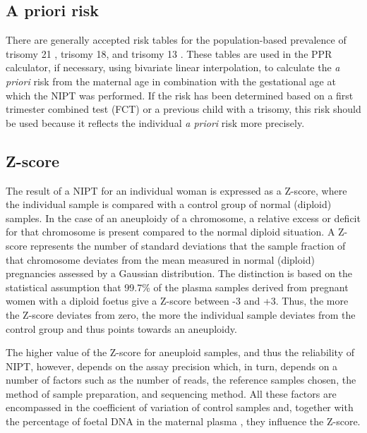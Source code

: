 \subsection{A priori risk}
There are generally accepted risk tables for the population-based prevalence of trisomy 21 \cite{Snijders_1999}, trisomy 18, and trisomy 13 \cite{Snijders_1995}. 
These tables are used in the PPR calculator, if necessary, using bivariate linear interpolation, to calculate the \textsl{a priori} risk from the maternal age in combination with the gestational age at which the NIPT was performed. 
If the risk has been determined based on a first trimester combined test (FCT) or a previous child with a trisomy, this risk should be used because it reflects the individual \textsl{a priori} risk more precisely.

\subsection{Z-score}
The result of a NIPT for an individual woman is expressed as a Z-score, where the individual sample is compared with a control group of normal (diploid) samples. 
In the case of an aneuploidy of a chromosome, a relative excess or deficit for that chromosome is present compared to the normal diploid situation. 
A Z-score represents the number of standard deviations that the sample fraction of that chromosome deviates from the mean measured in normal (diploid) pregnancies assessed by a Gaussian distribution. 
The distinction is based on the statistical assumption that 99.7\% of the plasma samples derived from pregnant women with a diploid foetus give a Z-score between -3 and +3. 
Thus, the more the Z-score deviates from zero, the more the individual sample deviates from the control group and thus points towards an aneuploidy.

The higher value of the Z-score for aneuploid samples, and thus the reliability of NIPT, however, depends on the assay precision which, in turn, depends on a number of factors such as the number of reads, the reference samples chosen, the method of sample preparation, and sequencing method. 
All these factors are encompassed in the coefficient of variation of control samples and, together with the percentage of foetal DNA in the maternal plasma \cite{Ashoor_2012b}, they influence the Z-score.

